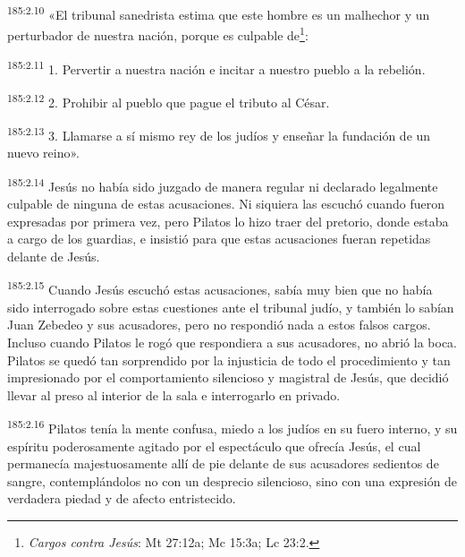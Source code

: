 \par
\textsuperscript{185:2.10} «El tribunal sanedrista estima que este hombre es un malhechor y un perturbador de nuestra nación, porque es culpable de\footnote{\textit{Cargos contra Jesús}: Mt 27:12a; Mc 15:3a; Lc 23:2.}:

\par
\textsuperscript{185:2.11} 1. Pervertir a nuestra nación e incitar a nuestro pueblo a la rebelión.

\par
\textsuperscript{185:2.12} 2. Prohibir al pueblo que pague el tributo al César.

\par
\textsuperscript{185:2.13} 3. Llamarse a sí mismo rey de los judíos y enseñar la fundación de un nuevo reino».

\par
\textsuperscript{185:2.14} Jesús no había sido juzgado de manera regular ni declarado legalmente culpable de ninguna de estas acusaciones. Ni siquiera las escuchó cuando fueron expresadas por primera vez, pero Pilatos lo hizo traer del pretorio, donde estaba a cargo de los guardias, e insistió para que estas acusaciones fueran repetidas delante de Jesús.

\par
\textsuperscript{185:2.15} Cuando Jesús escuchó estas acusaciones, sabía muy bien que no había sido interrogado sobre estas cuestiones ante el tribunal judío, y también lo sabían Juan Zebedeo y sus acusadores, pero no respondió nada a estos falsos cargos. Incluso cuando Pilatos le rogó que respondiera a sus acusadores, no abrió la boca. Pilatos se quedó tan sorprendido por la injusticia de todo el procedimiento y tan impresionado por el comportamiento silencioso y magistral de Jesús, que decidió llevar al preso al interior de la sala e interrogarlo en privado.

\par
\textsuperscript{185:2.16} Pilatos tenía la mente confusa, miedo a los judíos en su fuero interno, y su espíritu poderosamente agitado por el espectáculo que ofrecía Jesús, el cual permanecía majestuosamente allí de pie delante de sus acusadores sedientos de sangre, contemplándolos no con un desprecio silencioso, sino con una expresión de verdadera piedad y de afecto entristecido.

